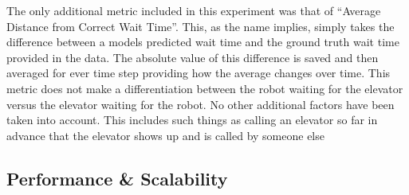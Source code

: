 The only additional metric included in this experiment was that of ``Average
Distance from Correct Wait Time''. This, as the name implies, simply takes the
difference between a models predicted wait time and the ground truth wait time
provided in the data. The absolute value of this difference is saved and then
averaged for ever time step providing how the average changes over time. This
metric does not make a differentiation between the robot waiting for the
elevator versus the elevator waiting for the robot. No other additional
factors have been taken into account. This includes such things as calling an
elevator so far in advance that the elevator shows up and is called by someone
else

\subsection{ Performance \& Scalability }

\begin{table}[h!]
  \centering
  \caption{Elevator Wait Time Overview}
  \label{table:Elevator_Wait_Time_Overview}
\end{table}


\begin{table}[h!]
  \centering
  \caption{High Resolution Elevator Wait Time Overview}
  \label{table:High_Resolution_Elevator_Wait_Time_Overview}
\end{table}

